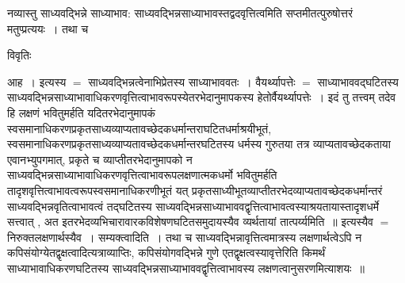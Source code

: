 \documentclass[10pt, openany]{book}
\begin{document}
{{नव्यास्तु  {\qt साध्यवद्भिन्ने साध्याभाव: }साध्यवद्भिन्नसाध्याभावस्तद्वदवृत्तित्वमिति सप्तमीतत्पुरुषोत्तरं मतुप्प्रत्ययः~। तथा च }
\begin{center}     विवृतिः \end{center}
आह~। इत्यस्य $=$ साध्यवद्भिन्नत्वेनाभिप्रेतस्य साध्याभाववतः~। वैयर्थ्यापत्तेः $=$ साध्याभाववद्घटितस्य
साध्यवद्भिन्नसाध्याभावाधिकरणवृत्तित्वाभावरूपस्येतरभेदानुमापकस्य हेतोर्वैयर्थ्यापत्तेः~। इदं तु तत्त्वम् {\qt तदेव हि लक्षणं भवितुमर्हति} यदितरभेदानुमापकं स्वसमानाधिकरणप्रकृतसाध्यव्याप्यतावच्छेदकधर्मान्तराघटितधर्माश्रयीभूतं, स्वसमानाधिकरणप्रकृतसाध्यव्याप्यतावच्छेदकधर्मान्तरघटितस्य धर्मस्य गुरुतया तत्र व्याप्यतावच्छेदकताया एवानभ्युपगमात्, प्रकृते च व्याप्तीतरभेदानुमापको न साध्यवद्भिन्नसाध्याभावाधिकरणवृत्तित्वाभावरूपलक्षणात्मकधर्मो भवितुमर्हति
तादृशवृत्तित्वाभावत्वरूपस्वसमानाधिकरणीभूतं यत् प्रकृतसाध्यीभूतव्याप्तीतरभेदव्याप्यतावच्छेदकधर्मान्तरं साध्यवद्भिन्नवृतित्वाभावत्वं तद्घटितस्य
साध्यवद्भिन्नसाध्याभाववद्वृत्तित्वाभावत्वस्याश्रयतायास्तादृशधर्मे सत्त्वात् , अत इतरभेदव्यभिचारावारकविशेषणघटितसमुदायस्यैव व्यर्थतायां तात्पर्य्यमिति~॥ इत्यस्यैव $=$ निरुक्तलक्षणार्थस्यैव~। सम्यक्त्वादिति~। तथा च साध्यवद्भिन्नावृत्तित्वमात्रस्य लक्षणार्थत्वेऽपि न कपिसंयोग्येतद्वृक्षत्वादित्यत्राव्याप्तिः, कपिसंयोगवद्भिन्ने गुणे एतद्वृक्षत्वस्यावृत्तेरिति किमर्थं साध्याभावाधिकरणघटितस्य साध्यवद्भिन्नसाध्याभाववद्वृत्तित्वाभावस्य लक्षणत्वानुसरणमित्याशयः~॥\\

}
\end{document}
